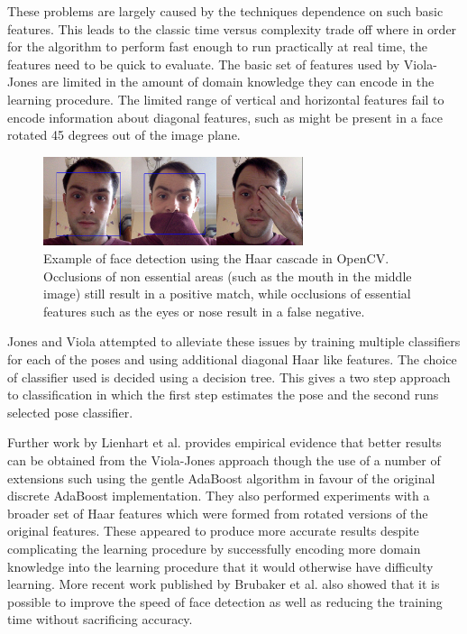 \documentclass[conference]{IEEEtran}
\begin{document}
These problems are largely caused by the techniques dependence on such basic features. This leads to the classic time versus complexity trade off where in order for the algorithm to perform fast enough to run practically at real time, the features need to be quick to evaluate. The basic set of features used by Viola-Jones are limited in the amount of domain knowledge they can encode in the learning procedure. The limited range of vertical and horizontal features fail to encode information about diagonal features, such as might be present in a face rotated 45 degrees out of the image plane.

\begin{figure}[!t]
\centering
\includegraphics[width=3in]{img/face_detect_example.jpg}
\caption{Example of face detection using the Haar cascade in OpenCV. Occlusions of non essential areas (such as the mouth in the middle image) still result in a positive match, while occlusions of essential features such as the eyes or nose result in a false negative.}
\label{fig:occlusions}
\end{figure}

Jones and Viola \cite{jones2003fast} attempted to alleviate these issues by training multiple classifiers for each of the poses and using additional diagonal Haar like features. The choice of classifier used is decided using a decision tree. This gives a two step approach to classification in which the first step estimates the pose and the second runs selected pose classifier.

Further work by Lienhart et al. \cite{lienhart2002extended} provides empirical evidence that better results can be obtained from the Viola-Jones approach though the use of a number of extensions such using the gentle AdaBoost algorithm in favour of the original discrete AdaBoost implementation. They also performed experiments with a broader set of Haar features which were formed from rotated versions of the original features. These appeared to produce more accurate results despite complicating the learning procedure by successfully encoding more domain knowledge into the learning procedure that it would otherwise have difficulty learning. More recent work published by Brubaker et al. \cite{brubaker2008design} also showed that it is possible to improve the speed of face detection as well as reducing the training time without sacrificing accuracy.
\end{document}
